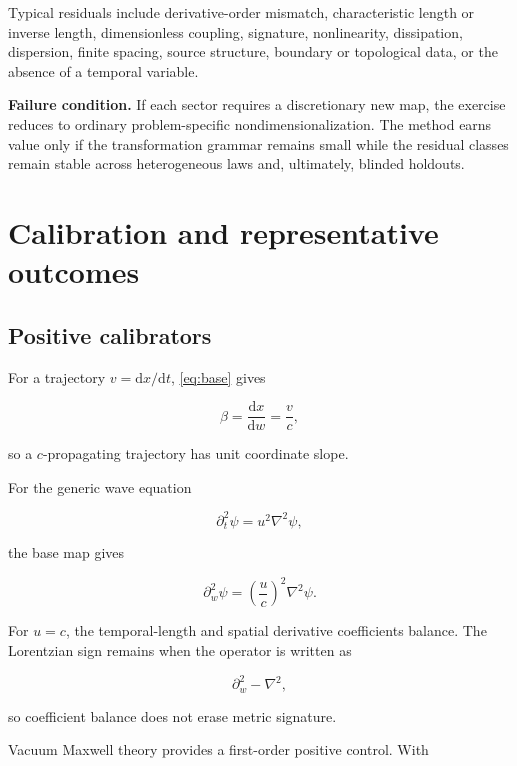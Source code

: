 \documentclass[10pt]{article}
\newcommand{\dd}{\mathrm d}
\newcommand{\lap}{\nabla^2}
\begin{document}
Typical residuals include derivative-order mismatch, characteristic
length or inverse length, dimensionless coupling, signature,
nonlinearity, dissipation, dispersion, finite spacing, source
structure, boundary or topological data, or the absence of a
temporal variable.

\textbf{Failure condition.}
If each sector requires a discretionary new map, the exercise reduces
to ordinary problem-specific nondimensionalization. The method earns
value only if the transformation grammar remains small while the
residual classes remain stable across heterogeneous laws and,
ultimately, blinded holdouts.

\section{Calibration and representative outcomes}

\subsection{Positive calibrators}

For a trajectory \(v=\dd x/\dd t\), \cref{eq:base} gives

\begin{equation}
  \beta
  =
  \frac{\dd x}{\dd w}
  =
  \frac{v}{c},
\end{equation}

so a \(c\)-propagating trajectory has unit coordinate slope.

For the generic wave equation

\begin{equation}
  \partial_t^2\psi=u^2\lap\psi,
\end{equation}

the base map gives

\begin{equation}
  \partial_w^2\psi
  =
  \left(\frac{u}{c}\right)^2\lap\psi .
  \label{eq:wave}
\end{equation}

For \(u=c\), the temporal-length and spatial derivative coefficients
balance. The Lorentzian sign remains when the operator is written as

\begin{equation}
  \partial_w^2-\lap ,
\end{equation}

so coefficient balance does not erase metric signature.

Vacuum Maxwell theory provides a first-order positive control. With
\end{document}
